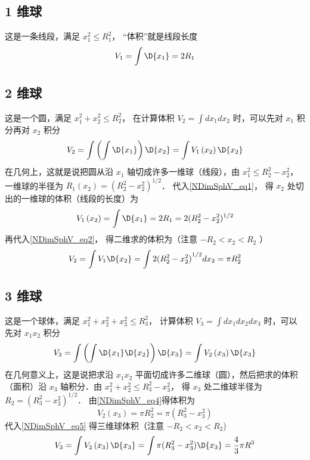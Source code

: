 \subsection{ 1 维球}
这是一条线段，满足 $x_1^2 \le R_1^2$， “体积”就是线段长度
\begin{equation}\label{NDimSphV_eq1}
{V_1} = \int {\D {x_1}}  = 2{R_1}
\end{equation}
\subsection{ 2 维球}
这是一个圆，满足 $x_1^2 + x_2^2 \le R_2^2$， 在计算体积 ${V_2} = \int {d{x_1}d{x_2}} $ 时，可以先对 ${x_1}$ 积分再对 ${x_2}$ 积分
\begin{equation}\label{NDimSphV_eq2}
{V_2} = \int {\left( {\int {\D {x_1}} } \right)\D {x_2}}  = \int {{V_1}\left( {{x_2}} \right)\D {x_2}} 
\end{equation}
在几何上，这就是说把圆从沿 ${x_1}$ 轴切成许多一维球（线段），由 $x_1^2 \le R_2^2 - x_2^2$， 一维球的半径为 ${R_1}\left( {{x_2}} \right) = {(R_2^2 - x_2^2)^{1/2}}$． 代入\autoref{NDimSphV_eq1}， 得 ${x_2}$ 处切出的一维球的体积（线段的长度）为
\begin{equation}\label{NDimSphV_eq3}
{V_1}\left( {{x_2}} \right) = \int {\D {x_1}}  = 2{R_1} = 2{(R_2^2 - x_2^2)^{1/2}}
\end{equation}
再代入\autoref{NDimSphV_eq2}， 得二维求的体积为（注意 $ - {R_2} < {x_2} < {R_2}$ ）
\begin{equation}\label{NDimSphV_eq4}
{V_2} = \int {{V_1}\D {x_2}}  = \int {2{{(R_2^2 - x_2^2)}^{1/2}}d{x_2}}  = \pi R_2^2
\end{equation}
\subsection{ 3 维球}
这是一个球体，满足 $x_1^2 + x_2^2 + x_3^2 \le R_3^2$， 计算体积 ${V_3} = \int {d{x_1}d{x_2}} d{x_3}$ 时，可以先对 ${x_1}{x_2}$ 积分
\begin{equation}\label{NDimSphV_eq5}
{V_3} = \int {\left( {\int {\D {x_1}\D {x_2}} } \right)\D {x_3}}  = \int {{V_2}\left( {{x_3}} \right)\D {x_3}} 
\end{equation}
在几何意义上，这是说把求沿 ${x_1}{x_2}$ 平面切成许多二维球（圆），然后把求的体积（面积）沿 ${x_3}$ 轴积分．由 $x_1^2 + x_2^2 \le R_3^2 - x_3^2$， 得 ${x_3}$ 处二维球半径为 ${R_2} = {(R_3^2 - x_3^2)^{1/2}}$． 由\autoref{NDimSphV_eq4}得体积为
\begin{equation}\label{NDimSphV_eq6}
{V_2}\left( {{x_3}} \right) = \pi R_2^2 = \pi (R_3^2 - x_3^2)
\end{equation}
代入\autoref{NDimSphV_eq5} 得三维球体积（注意 $ - {R_2} < {x_2} < {R_2}$)
\begin{equation}\label{NDimSphV_eq7}
{V_3} = \int {{V_2}\left( {{x_3}} \right)\D {x_3}}  = \int {\pi (R_3^2 - x_3^2)\D {x_3}}  = \frac{4}{3}\pi {R^3}
\end{equation}
